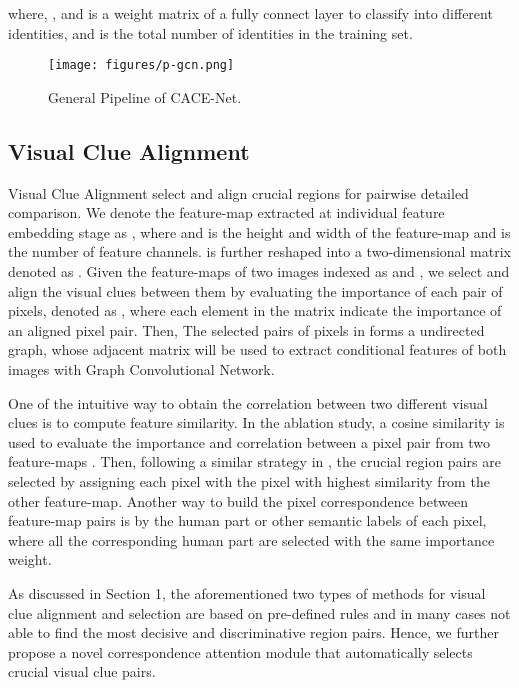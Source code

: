 \documentclass[final]{cvpr}
\begin{document}
where, , and  is a weight matrix of a fully connect layer to classify  into different identities, and  is the total number of identities in the training set. 

\begin{figure*}[t]
\centering
\texttt{[image: figures/p-gcn.png]} \caption{General Pipeline of CACE-Net. }
\label{fig_pipeline}
\end{figure*}

\subsection{Visual Clue Alignment}
Visual Clue Alignment select and align crucial regions  for pairwise detailed comparison. 
We denote the feature-map extracted at individual feature embedding stage as , where  and  is the height and width of the feature-map and  is the number of feature channels.  is further reshaped into a two-dimensional  matrix denoted as . 
Given the feature-maps of two images indexed as  and , we select and align the visual clues between them by evaluating the importance of each pair of pixels, denoted as , where each element  in the matrix indicate the importance of an aligned pixel pair. 
Then, The selected pairs of pixels in  forms a undirected graph, whose adjacent matrix  will be used to extract conditional features of both images with Graph Convolutional Network. 



One of the intuitive way to obtain the correlation between two different visual clues is to compute feature similarity. 
In the ablation study, a cosine similarity is used to evaluate the importance and correlation between a pixel pair from two feature-maps .  
Then, following a similar strategy in \cite{zhang2017alignedreid}, the crucial region pairs are selected by assigning each pixel with the pixel with  highest similarity from the other feature-map. Another way to build the pixel correspondence between feature-map pairs is by the human part or other semantic labels of each pixel, 
where all the corresponding human part are selected with the same importance weight. 



As discussed in Section 1, the aforementioned two types of methods for visual clue alignment and selection are based on pre-defined rules and in many cases not able to find the most decisive and discriminative region pairs. Hence, we further propose a novel correspondence attention module that automatically selects crucial visual clue pairs. 
\end{document}

